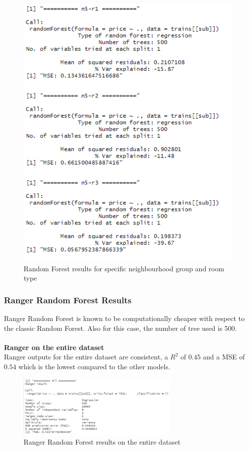 \documentclass{FR16}
\begin{document}
\begin{figure}[!htb]
\begin{minipage}{0.33\textwidth}
     \includegraphics[width=1\linewidth]{figures/rf6.png}
   \end{minipage}
        \caption{Random Forest results for specific neighbourhood group and room type}\label{fig:15}

\end{figure}

\newpage
\subsubsection{Ranger Random Forest Results}
Ranger Random Forest is known to be computationally cheaper with respect to the classic Random Forest. Also for this case, the number of tree used is 500.
\\\\ \textbf{Ranger on the entire dataset }\\
Ranger outputs for the entire dataset are consistent, a $R^2$ of $0.45$ and a MSE of $0.54$ which is the lowest compared to the other models.

\begin{figure}[h]
\centering
\includegraphics[width=0.7\textwidth]{figures/rgn.PNG} 
 \caption{\label{fig:16} Ranger Random Forest results on the entire dataset}
\end{figure}
\end{document}

